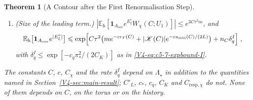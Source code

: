 \documentclass[11pt]{article}
\numberwithin{equation}{section}
\newtheorem{theorem}{Theorem}[section]
\theoremstyle{remark}
\theoremstyle{plain}
\begin{document}
\begin{theorem}[A Contour after the First Renormalisation Step]
\begin{enumerate}[label=(\roman*)]
\begin{equation}
\begin{gathered}
            | E_{\mathrm{def}}|\leqslant C'_Ln_Ce^{-(c_*/2)\pi_*^2}+e^{C_{\chi} n_C\rho(\varepsilon_1+e^{-cb/(LM)})}-1\;,\\
            | E_{\mathrm{bdry}}|\leqslant C_{\mathrm{resp},\chi}\,n_C(1+g_0r)\,e^{-c_*\pi_*^2}\;.
        \end{gathered}
    \end{equation}
    \item (Size of the leading term.) $|\mathbb E_{\mathrm h}[\mathbf 1_{A_{\mathrm{cov}}}e^{E^{\circ}_{\xi}}W_{\chi}(C;U_1)]|\leqslant e^{3C\tau^2m}$, and
    \begin{equation}\label{eq:torus-theorem-moment}
        \mathbb E_{\mathrm h}\bigl[\mathbf 1_{A_{\mathrm{cov}}}e^{| E^{\circ}_{\xi}|}\bigr]\leqslant \exp\Bigl[C\tau^2\bigl(me^{-c\iota_T(C)}+|\mathscr K(C)|e^{-cs_{\min}(C)/(2L)}\bigr)+n_C\delta^I_q\Bigr]\;,
    \end{equation}
    with $\delta^I_q\leqslant \exp[-c_q\pi_*^2/(2C_K)]$ as in \eqref{V4-eq:c5-7-expbound-I}.
\end{enumerate}
The constants $C$, $c$, $C_{\chi}$ and the rate $\delta^I_q$ depend on $\Lambda_{\star}$ in addition to the quantities named in Section~\ref{V4-sec:main-result}; $C'_L$, $c_*$, $c_q$, $C_K$ and $C_{\mathrm{resp},\chi}$ do not. None of them depends on $C$, on the torus or on the history.
\end{theorem}
\end{document}

